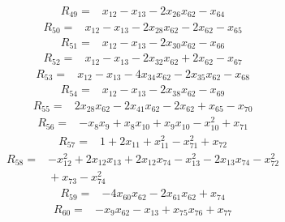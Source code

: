 {\begin{align*}
R_{49} ={}& x_{12} - x_{13} - 2x_{26} x_{62} - x_{64}
\end{align*}
\begin{align*}
R_{50} ={}& x_{12} - x_{13} - 2x_{28} x_{62} - 2x_{62} - x_{65}
\end{align*}
\begin{align*}
R_{51} ={}& x_{12} - x_{13} - 2x_{30} x_{62} - x_{66}
\end{align*}
\begin{align*}
R_{52} ={}& x_{12} - x_{13} - 2x_{32} x_{62} + 2x_{62} - x_{67}
\end{align*}
\begin{align*}
R_{53} ={}& x_{12} - x_{13} - 4x_{34} x_{62} - 2x_{35} x_{62} - x_{68}
\end{align*}
\begin{align*}
R_{54} ={}& x_{12} - x_{13} - 2x_{38} x_{62} - x_{69}
\end{align*}
\begin{align*}
R_{55} ={}& 2x_{28} x_{62} - 2x_{41} x_{62} - 2x_{62} + x_{65} - x_{70}
\end{align*}
\begin{align*}
R_{56} ={}& -x_{8} x_{9} + x_{8} x_{10} + x_{9} x_{10} - x_{10}^{2} + x_{71}
\end{align*}
\begin{align*}
R_{57} ={}& 1 + 2x_{11} + x_{11}^{2} - x_{71}^{2} + x_{72}
\end{align*}
\begin{align*}
R_{58} ={}& -x_{12}^{2} + 2x_{12} x_{13} + 2x_{12} x_{74} - x_{13}^{2} - 2x_{13} x_{74} - x_{72}^{2} \\
&{}  + x_{73} - x_{74}^{2}
\end{align*}
\begin{align*}
R_{59} ={}& -4x_{60} x_{62} - 2x_{61} x_{62} + x_{74}
\end{align*}
\begin{align*}
R_{60} ={}& -x_{9} x_{62} - x_{13} + x_{75} x_{76} + x_{77}
\end{align*}
\begin{align*}

\end{align*}}
